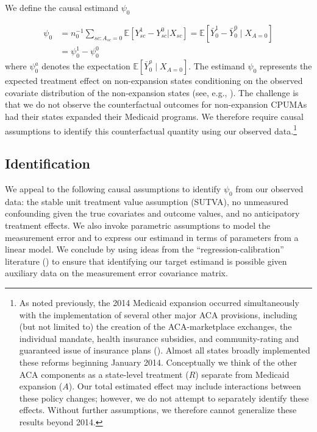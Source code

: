 \documentclass[aoas]{imsart}
\theoremstyle{plain}
\theoremstyle{remark}
\begin{document}
We define the causal estimand $\psi_0$

\begin{align} \label{eqn:psi}
    \psi_0&= n_0^{-1} \sum_{sc: A_{sc}=0} \mathbb{E}\left[ Y_{sc}^1 - Y_{sc}^0 | X_{sc}\right] = \mathbb{E}[\bar{Y}_0^1 - \bar{Y}_0^0 \mid X_{A=0}] \\ 
    &= \psi_0^1 - \psi_0^0
\end{align}
where $\psi_0^a$ denotes the expectation $\mathbb{E}[\bar{Y}_0^a \mid X_{A=0}]$. The estimand $\psi_0$ represents the expected treatment effect on non-expansion states conditioning on the observed covariate distribution of the non-expansion states (see, e.g., \cite{imbens2004nonparametric}). The challenge is that we do not observe the counterfactual outcomes for non-expansion CPUMAs had their states expanded their Medicaid programs. We therefore require causal assumptions to identify this counterfactual quantity using our observed data.\footnote{As noted previously, the 2014 Medicaid expansion occurred simultaneously with the implementation of several other major ACA provisions, including (but not limited to) the creation of the ACA-marketplace exchanges, the individual mandate, health insurance subsidies, and community-rating and guaranteed issue of insurance plans (\cite{courtemanche2017early}). Almost all states broadly implemented these reforms beginning January 2014. Conceptually we think of the other ACA components as a state-level treatment ($R$) separate from Medicaid expansion ($A$). Our total estimated effect may include interactions between these policy changes; however, we do not attempt to separately identify these effects. Without further assumptions, we therefore cannot generalize these results beyond 2014.} 

\subsection{Identification} \label{ssec:identification}

We appeal to the following causal assumptions to identify $\psi_0$ from our observed data: the stable unit treatment value assumption (SUTVA), no unmeasured confounding given the true covariates and outcome values, and no anticipatory treatment effects. We also invoke parametric assumptions to model the measurement error and to express our estimand in terms of parameters from a linear model. We conclude by using ideas from the ``regression-calibration'' literature (\cite{gleser1992importance}) to ensure that identifying our target estimand is possible given auxiliary data on the measurement error covariance matrix.
\end{document}
